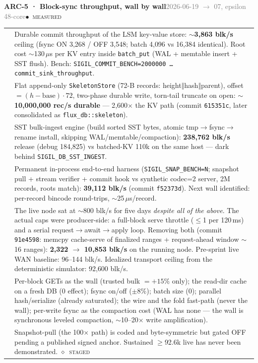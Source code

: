 \documentclass[10pt,a4paper]{article}
\makeatletter
\newcommand{\stM}{\textcolor{sigilcyan}{$\bullet$}~{\scriptsize\textcolor{sigilcyan}{\textsc{measured}}}}
\newcommand{\stG}{\textcolor{sigilviolet}{$\diamond$}~{\scriptsize\textcolor{sigilviolet}{\textsc{staged}}}}
\newcommand{\measured}[1]{\textcolor{sigilcyan}{\textbf{#1}}}
\newcommand{\frow}[2]{{\footnotesize\textcolor{gray}{\textsc{#1}}}\;&\small #2\\}
\newenvironment{mentry}[4]{%
\begin{tcolorbox}[enhanced,breakable,colback=white,colframe=slate,boxrule=0.6pt,arc=2pt,
  left=8pt,right=8pt,top=6pt,bottom=6pt,
  borderline west={3pt}{0pt}{sigilcyan!70!slate}]
{\small\textbf{#1 · #2}\hfill{\footnotesize\textcolor{gray}{#3}}\quad#4}\\[4pt]
\begin{tabular}{@{}>{\raggedleft\arraybackslash}p{1.8cm}p{13.2cm}@{}}
}{%
\end{tabular}
\end{tcolorbox}\vspace{2pt}}
\makeatother
\begin{document}
\begin{mentry}{ARC-5}{Block-sync throughput, wall by wall}{2026-06-19 $\to$ 07, epsilon 48-core}{\stM}
\frow{measured}{Durable commit throughput of the LSM key-value store:
\measured{$\sim$3{,}863 blk/s} ceiling (fsync ON 3{,}268 / OFF 3{,}548; batch 4{,}096 vs
16{,}384 identical). Root cost $\sim$130\,$\mu$s per KV entry inside \texttt{batch\_put}
(WAL + memtable insert + SST flush). Bench:
\texttt{SIGIL\_COMMIT\_BENCH=2000000 \ldots{} commit\_sink\_throughput}.}
\frow{fix 1}{Flat append-only \texttt{SkeletonStore} (72-B records:
height$\Vert$hash$\Vert$parent), offset $=(h-\mathrm{base})\cdot 72$, two-phase durable
write, torn-tail truncate on open: \measured{$\sim$10{,}000{,}000 rec/s durable} ---
2{,}600$\times$ the KV path (commit \texttt{615351c}, later consolidated as
\texttt{flux\_db::skeleton}).}
\frow{fix 2}{SST bulk-ingest engine (build sorted SST bytes, atomic
tmp$\to$fsync$\to$rename install, skipping WAL/memtable/compaction):
\measured{238{,}762 blk/s} release (debug 184{,}825) vs batched-KV 110k on the same
host --- dark behind \texttt{SIGIL\_DB\_SST\_INGEST}.}
\frow{harness}{Permanent in-process end-to-end harness (\texttt{SIGIL\_SNAP\_BENCH=N};
snapshot pull + stream verifier + commit hook vs synthetic codec=2 server, 2M records,
roots match): \measured{39{,}112 blk/s} (commit \texttt{f52373d}). Next wall identified:
per-record bincode round-trips, $\sim$25\,$\mu$s/record.}
\frow{live}{The live node sat at $\sim$800 blk/s for five days \emph{despite all of the
above}. The actual caps were producer-side: a full-block serve throttle
($\le$1 per 120\,ms) and a serial request$\to$await$\to$apply loop. Removing both
(commit \texttt{91e4598}: memcpy cache-serve of finalized ranges + request-ahead window
$\sim$16 ranges): \measured{2{,}322 $\to$ 10{,}853 blk/s} on the running node.
Pre-sprint live WAN baseline: 96--144 blk/s. Idealized transport ceiling from the
deterministic simulator: 92{,}600 blk/s.}
\frow{ruled out}{Per-block GETs as the wall (trusted bulk $=+15\%$ only); the read-dir
cache on a fresh DB (0 effect); fsync on/off ($\pm 8\%$); batch size (0); parallel
hash/serialize (already saturated); the wire and the fold fast-path (never the wall);
per-write fsync as the compaction cost (WAL has none --- the wall is synchronous leveled
compaction, $\sim$10--20$\times$ write amplification).}
\frow{open}{Snapshot-pull (the 100$\times$ path) is coded and byte-symmetric but gated
OFF pending a published signed anchor. Sustained $\ge$92.6k live has never been
demonstrated. \stG}
\end{mentry}
\end{document}

